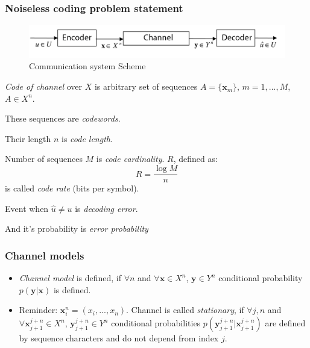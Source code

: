 \documentclass[14pt]{beamer}
\renewcommand{\vec}[1]{\ensuremath{\boldsymbol{#1}}}
\begin{document}
\begin{frame}
\frametitle{Noiseless coding problem statement}
\begin{itemize}
\small{

    \item
        \begin{figure}[ht]
        \begin{minipage}{1.0\linewidth}
        \includegraphics[width=1.0\textwidth]{fig5_1.png}
        \caption{Communication system Scheme}
        \label{fig5_1}
        \end{minipage}
        \end{figure}    

    \pause 
    \item
        \textit{Code of channel} over $X$ is arbitrary set of sequences $A = \{{\vec x}_m \}$, $m = 1,...,M$, $A \in X^n$. 
    \item    
        These sequences are \textit{codewords}.
    \item    
        Their length $n$ is \textit{code length}. 
    \item   
        Number of sequences $M$ is \textit{code cardinality}.
        $R$, defined as:
        \begin{equation}
            R = \frac{\log M}{n}
        \end{equation}
        is called \textit{code rate} (bits per symbol).
    \item 
        Event when $\hat {u} \ne u$ is \textit{decoding error}.
    \item 
        And it's probability is \textit{error probability}
}
\end{itemize}
\end{frame}



\begin{frame}
\frametitle{Channel models}
\begin{itemize}
\item
    \textit{Channel model} is defined, if $\forall  n$ and $\forall  {\vec x} \in X^n$, ${\vec y} \in Y^n$ conditional probability $p({\vec y}\vert {\vec x})$ is defined.

\pause \item
    Reminder: ${\vec x}_i^n = (x_i ,...,x_n )$. 
    Channel is called \textit{stationary}, if $\forall  j, n $ and $ \forall {\vec x}_{j + 1}^{j + n} \in X^n$, ${\vec y}_{j + 1}^{j + n} \in Y^n$ conditional probabilities $p({\vec y}_{j + 1}^{j + n} \vert {\vec x}_{j + 1}^{j + n} )$ are defined by sequence characters and do not depend from index $j$.

\end{itemize}
\end{frame}
\end{document}
